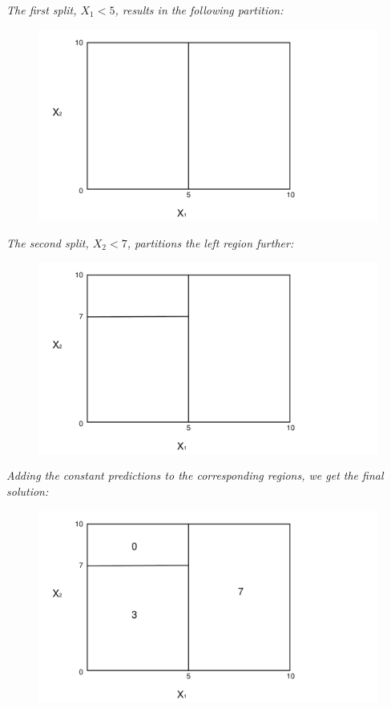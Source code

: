 \documentclass[12pt, answers]{exam}
\begin{document}
\textit{The first split, $X_1<5$, results in the following partition:}
\begin{figure}[!h]
\includegraphics[scale=0.22]{P1b.pdf}
\end{figure}

\textit{The second split, $X_2<7$, partitions the left region further:}
\begin{figure}[!h]
\includegraphics[scale=0.22]{P1c.pdf}
\end{figure}

\textit{Adding the constant predictions to the corresponding regions, we get the final solution:}
\begin{figure}[!h]
\includegraphics[scale=0.28]{P1.pdf}
\end{figure}
\end{document}
